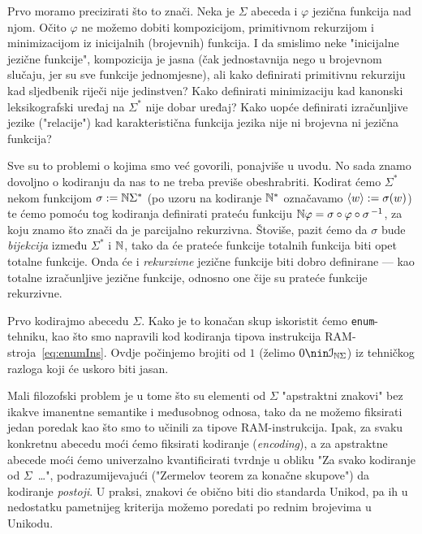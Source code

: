 Prvo moramo precizirati što to znači. Neka je $\Sigma$ abeceda i $\varphi$ jezična funkcija nad njom. Očito $\varphi$ ne možemo dobiti kompozicijom, primitivnom rekurzijom i minimizacijom iz inicijalnih (brojevnih) funkcija. I da smislimo neke "inicijalne jezične funkcije", kompozicija je jasna (čak jednostavnija nego u brojevnom slučaju, jer su sve funkcije jednomjesne), ali kako definirati primitivnu rekurziju kad sljedbenik riječi nije jedinstven? Kako definirati minimizaciju kad kanonski leksikografski uređaj na $\Sigma^*$ nije dobar uređaj? Kako uopće definirati izračunljive jezike ("relacije") kad karakteristična funkcija jezika nije ni brojevna ni jezična funkcija?

Sve su to problemi o kojima smo već govorili, ponajviše u uvodu. No sada znamo dovoljno o kodiranju da nas to ne treba previše obeshrabriti. Kodirat ćemo $\Sigma^*$ nekom funkcijom $\sigma:={\mathbb N}\Sigma^*$ (po uzoru na kodiranje ${\mathbb N}^*$ označavamo $\langle w\rangle:=\sigma(w)$) te ćemo pomoću tog kodiranja definirati prateću funkciju ${\mathbb N}\varphi=\sigma\circ\varphi\circ\sigma^{\,-1}$, za koju znamo što znači da je parcijalno rekurzivna.
Štoviše, pazit ćemo da $\sigma$ bude \emph{bijekcija} između $\Sigma^*$ i ${\mathbb N}$, tako da će prateće funkcije totalnih funkcija biti opet totalne funkcije. Onda će i \emph{rekurzivne} jezične funkcije biti dobro definirane --- kao totalne izračunljive jezične funkcije, odnosno one čije su prateće funkcije rekurzivne.


Prvo kodirajmo abecedu $\Sigma$. Kako je to konačan skup iskoristit ćemo \texttt{enum}-tehniku, kao što smo napravili kod kodiranja tipova instrukcija RAM-stroja~\eqref{eq:enumIns}. Ovdje počinjemo brojiti od $1$ (želimo $0\nin\im{\N\Sigma}$) iz tehničkog razloga koji će uskoro biti jasan.

Mali filozofski problem je u tome što su elementi od $\Sigma$ "apstraktni znakovi" bez ikakve imanentne semantike i međusobnog odnosa, tako da ne možemo fiksirati jedan poredak kao što smo to učinili za tipove RAM-instrukcija. Ipak, za svaku konkretnu abecedu moći ćemo fiksirati kodiranje (\emph{encoding}), a za apstraktne abecede moći ćemo univerzalno kvantificirati tvrdnje u obliku "Za svako kodiranje od $\Sigma$~\ldots", podrazumijevajući ("Zermelov teorem za konačne skupove") da kodiranje \emph{postoji}. U praksi, znakovi će obično biti dio standarda Unikod, pa ih u nedostatku pametnijeg kriterija možemo poredati po rednim brojevima u Unikodu.

